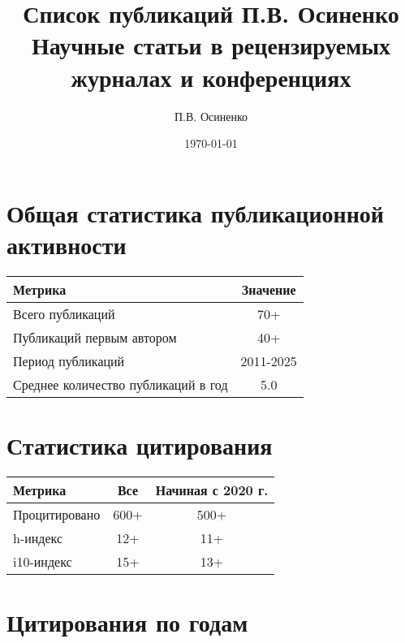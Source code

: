 \documentclass{article}
\begin{document}
\title{Список публикаций П.В. Осиненко\\
\large Научные статьи в рецензируемых журналах и конференциях}
\author{П.В. Осиненко}
\date{\today}
\maketitle

\section*{Общая статистика публикационной активности}

\begin{table}[h]
\centering
\begin{tabular}{|l|c|}
\hline
\textbf{Метрика} & \textbf{Значение} \\
\hline
Всего публикаций & 70+ \\
\hline
Публикаций первым автором & 40+ \\
\hline
Период публикаций & 2011-2025 \\
\hline
Среднее количество публикаций в год & 5.0 \\
\hline
\end{tabular}
\end{table}

\section*{Статистика цитирования}

\begin{table}[h]
\centering
\begin{tabular}{|l|c|c|}
\hline
\textbf{Метрика} & \textbf{Все} & \textbf{Начиная с 2020 г.} \\
\hline
Процитировано & 600+ & 500+ \\
\hline
h-индекс & 12+ & 11+ \\
\hline
i10-индекс & 15+ & 13+ \\
\hline
\end{tabular}
\end{table}

\section*{Цитирования по годам}
\end{document}
